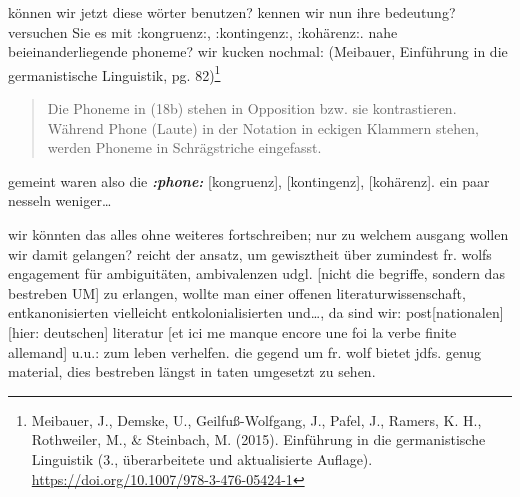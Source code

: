 \documentclass[
  letterpaper,
  DIV=11,
  numbers=noendperiod]{scrartcl}
\begin{document}
können wir jetzt diese wörter benutzen? kennen wir nun ihre bedeutung?
versuchen Sie es mit :kongruenz:, :kontingenz:, :kohärenz:. nahe
beieinanderliegende phoneme? wir kucken nochmal: (Meibauer, Einführung
in die germanistische Linguistik, pg. 82)\footnote{Meibauer, J., Demske,
  U., Geilfuß-Wolfgang, J., Pafel, J., Ramers, K. H., Rothweiler, M., \&
  Steinbach, M. (2015). Einführung in die germanistische Linguistik (3.,
  überarbeitete und aktualisierte Auflage).
  \url{https://doi.org/10.1007/978-3-476-05424-1}}

\begin{quote}
Die Phoneme in (18b) stehen in Opposition bzw. sie kontrastieren.
Während Phone (Laute) in der Notation in eckigen Klammern stehen, werden
Phoneme in Schrägstriche eingefasst.
\end{quote}

gemeint waren also die \textbf{\emph{:phone:}} {[}kongruenz{]},
{[}kontingenz{]}, {[}kohärenz{]}. ein paar nesseln weniger\ldots{}

wir könnten das alles ohne weiteres fortschreiben; nur zu welchem
ausgang wollen wir damit gelangen? reicht der ansatz, um gewisztheit
über zumindest fr. wolfs engagement für ambiguitäten, ambivalenzen udgl.
{[}nicht die begriffe, sondern das bestreben UM{]} zu erlangen, wollte
man einer offenen literaturwissenschaft, entkanonisierten vielleicht
entkolonialisierten und\ldots, da sind wir: post{[}nationalen{]}{[}hier:
deutschen{]} literatur {[}et ici me manque encore une foi la verbe
finite allemand{]} u.u.: zum leben verhelfen. die gegend um fr. wolf
bietet jdfs. genug material, dies bestreben längst in taten umgesetzt zu
sehen.
\end{document}

